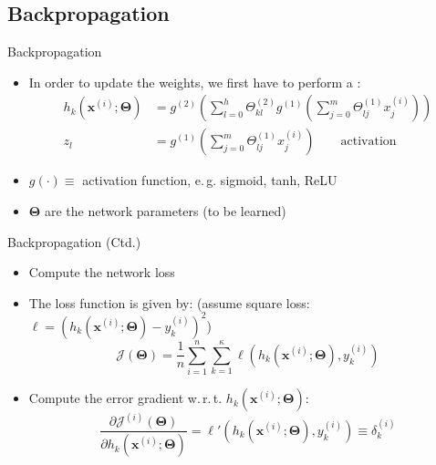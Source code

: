 \subsection{Backpropagation}

\begin{frame}{Backpropagation}{}\important
	\begin{itemize}
		\item In order to update the weights, we first have to perform a :
		\begin{align*}
			h_k(\bm{x}^{(i)}; \bm{\Theta})
				&= g^{(2)}\left( \sum_{l=0}^h \Theta_{kl}^{(2)} g^{(1)}\left( \sum_{j=0}^m \Theta_{lj}^{(1)} x_{j}^{(i)} \right) \right) \\
			z_l
				&=  g^{(1)}\left( \sum_{j=0}^m \Theta_{lj}^{(1)} x_{j}^{(i)} \right) \qquad\text{activation}
		\end{align*}
		\item $g(\cdot) \equiv$ activation function, e.\,g. sigmoid, tanh, ReLU
		\item $\bm{\Theta}$ are the network parameters (to be learned)
	\end{itemize}
\end{frame}


\begin{frame}[plain]{}{}
	
\end{frame}


\begin{frame}{Backpropagation (Ctd.)}{}\important
	\begin{itemize}
		\item Compute the network loss
		\item The loss function is given by: {\footnotesize(assume square loss: $\ell = (h_k(\bm{x}^{(i)}; \bm{\Theta}) - y_k^{(i)})^2$)}
		\begin{equation*}
			\mathcal{J}(\bm{\Theta}) = \frac{1}{n} \sum_{i=1}^n \sum_{k=1}^\kappa
				\ell(h_k(\bm{x}^{(i)}; \bm{\Theta}), y_k^{(i)})
		\end{equation*}
		\item Compute the error gradient w.\,r.\,t. $h_k(\bm{x}^{(i)}; \bm{\Theta})$:
		\begin{equation*}
			 \frac{\partial \mathcal{J}^{(i)}(\bm{\Theta})}{\partial h_k(\bm{x}^{(i)}; \bm{\Theta})}
			 	= \ell'(h_k(\bm{x}^{(i)}; \bm{\Theta}), y_k^{(i)}) \equiv \delta_k^{(i)}
		\end{equation*}
	\end{itemize}
\end{frame}



